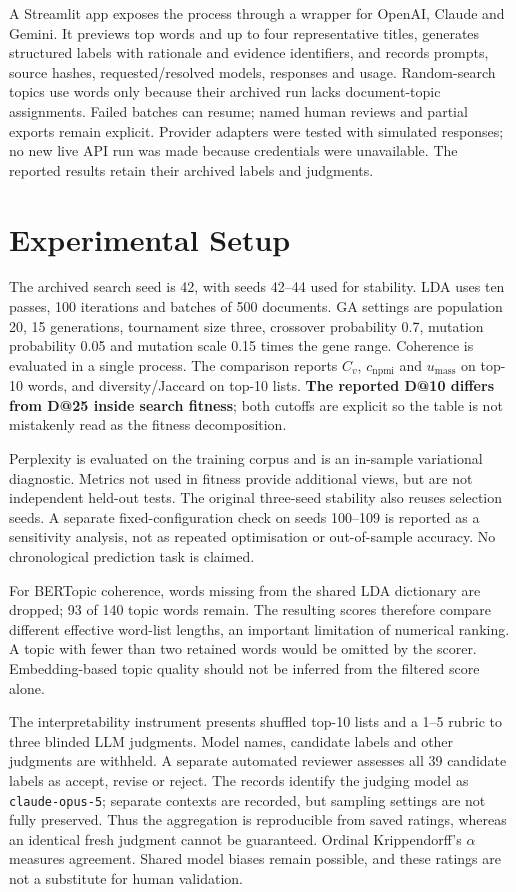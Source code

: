 A Streamlit app exposes the process through a wrapper for OpenAI,
Claude and Gemini. It previews top words and up to four representative titles, generates
structured labels with rationale and evidence identifiers, and records prompts, source hashes,
requested/resolved models, responses and usage. Random-search topics use words only because
their archived run lacks document-topic assignments. Failed batches can resume; named human
reviews and partial exports remain explicit. Provider adapters were tested with simulated
responses; no new live API run was made because credentials were unavailable. The reported
results retain their archived labels and judgments.

\section{Experimental Setup}
\label{sec:setup}

The archived search seed is 42, with seeds 42--44 used for stability. LDA uses ten passes,
100 iterations and batches of 500 documents. GA settings are population 20, 15 generations,
tournament size three, crossover probability 0.7, mutation probability 0.05 and mutation scale
0.15 times the gene range. Coherence is evaluated in a single process. The comparison reports
$C_v$, $c_{\mathrm{npmi}}$ and $u_{\mathrm{mass}}$ on top-10 words, and diversity/Jaccard on
top-10 lists. \textbf{The reported D@10 differs from D@25 inside search fitness}; both cutoffs
are explicit so the table is not mistakenly read as the fitness decomposition.

Perplexity is evaluated on the training corpus and is an in-sample variational diagnostic.
Metrics not used in fitness provide additional views, but are not independent held-out tests.
The original three-seed stability also reuses selection seeds. A separate fixed-configuration
check on seeds 100--109 is reported as a sensitivity analysis, not as repeated optimisation or
out-of-sample accuracy. No chronological prediction task is claimed.

For BERTopic coherence, words missing from the shared LDA dictionary are dropped; 93 of 140
topic words remain. The resulting scores therefore compare different effective word-list
lengths, an important limitation of numerical ranking. A topic with fewer than two retained
words would be omitted by the scorer. Embedding-based topic quality should not be inferred
from the filtered score alone.

The interpretability instrument presents shuffled top-10 lists and a 1--5 rubric to three
blinded LLM judgments. Model names, candidate labels and other judgments are withheld. A
separate automated reviewer assesses all 39 candidate labels as accept, revise or reject.
The records identify the judging model as \texttt{claude-opus-5}; separate contexts are recorded,
but sampling settings are not fully preserved. Thus the aggregation is reproducible from saved
ratings, whereas an identical fresh judgment cannot be guaranteed. Ordinal Krippendorff's
$\alpha$~\cite{krippendorff2004} measures agreement. Shared model biases remain possible, and
these ratings are not a substitute for human validation.

